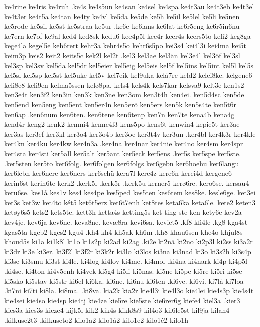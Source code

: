 {{ke4rine
ke4ris
ke4ruh
.ke4s
ke4s5un
ke4san
ke4sel
ke4spa
ke4t3au
ke4t3eb
ke4t3el
ke4t3er
ke4t5a
ke4tan
ke4ty
ke4vl
ke5da
ke5de
ke5h
ke5il
ke5lel
ke5li
ke5nen
ke5rode
ke5sil
ke5st
ke5straa
ke5ur
.ke6e
ke6lans
ke6lat
ke6r5eng
ke6r5in6nu
ke7ern
ke7of
ke9al
ked4
ked8sk
kedu6
kee4p5l
kee4r
keer4s
keers5to
kefi2
keg8ga
kege4la
kegel5e
keh6rert
kehr3a
kehr4s5o
kehr6s5po
kei3s4
kei4l3i
kei4ma
kei5t
keim3p
keis2
keit2
keits5c
kek2l
kel2t
.kel3
kel3ae
kel3än
kel3e4l
kel3öf
kel3sl
kel3sp
kel3sv
kel5da
kel5dr
kel5eier
kel5eig
kel5eis
kel5f
kel5ins
kel5int
kel5l
kel5s
kel5sl
kel5sp
kel5st
kel5uke
kel5v
kel7eik
kel9uka
kelå7re
keld2
kelei8ke.
kelgene6
keli8e8
keli9en
kelma5ssen
kelø8pa.
kels4
kels4k
kels7kar
kelsva9
kelt3e
ken1s2
ken3e4t
ken3f2
ken3in
ken3k
ken3ne
ken3om
ken3t4h
ken4ei.
ken5d4sc
ken5de
ken5end
ken5eng
ken5ent
ken5er4n
ken5erö
ken5ers
ken5k
ken5s4te
ken5t6r
ken6ap
.ken6num
ken6ten.
ken6tene
ken6tenp
ken7n
ken7te
kena4b
kena4g
kend4r
keng2
kenk2
kenmi4
kenne4l3
kens5po
kens6t
kenwin4
kepie5t
ker3ae
ker3as
ker3ef
ker3kl
ker3o4
ker3o4b
ker3oe
ker3t4v
ker3un
.ker4bl
ker4k3r
ker4kle
ker4kn
ker4ku
ker4kw
ker4n3a
.ker4na
ker4nar
ker4nie
ker4no
ker4sm
ker4spr
ker4sta
ker4sti
ker5all
ker5alt
ker5ant
ker5eck
ker5ens
.ker5s
ker5spe
ker5ste.
.ker5sten
ker5to
ker6folg.
ker6folgen
ker6folgs
ker6gebn
ker6hoehu
ker6langu
ker6lebn
ker6nere
ker6ners
ker6schü
kera7l
kere4z
kere6n
kerei4d
kergene6
kerin6st
kerin6te
kerk2
.kerk5l
.kerk5r
.kerk5u
kerner5
kerø6re.
kero6se.
kersau4
keru6se.
kes1å
kes1v
kes4
kes4pe
kes5ped
kes5ten
kes6tem
kes8ke.
kesle6ge.
ket3ei
ket3s
ket3w
ket4to
két5
ket6t5erz
ket6t7enh
ket8tes
keta6ka
keta6le.
kete2
keten3
ketøy6s5
kets2
kets5te.
kett3h
ketta4s
ketting5s
ket-ting-ste-ken
kety6e
kev2a
kev4je.
kev6ja
kev6ne.
keva8ne.
kevæ8ra
kevi6sa.
keviet5
.kf8
kfi4le
.kg8
kga4st
kgas5ta
kgeb2
kges2
kgu4
.kh4
kh4
kh5ak
kh6m
.kh8
khau6sen
khe4o
khjul8s
khoud5s
ki1a
ki1k8l
ki1o
ki1s2p
ki2ad
ki2ag
.ki2e
ki2nä
ki2no
ki2p3l
ki2ss
ki3a2r
ki3dr
ki3e
ki3er.
ki3f2l
ki3f2r
ki3k2r
ki3lo
ki3los
ki3na
ki3nad
ki3o
ki3s2h
ki3s4p
ki3se
ki3smu
ki3st
ki4le.
ki4log
ki4lov
ki4me.
ki4mol
.ki4na
ki4nark
ki4p
ki4p5l
.ki4se.
ki4ton
ki4v5enh
ki4vek
ki5g4
ki5li
ki5nas.
ki5ne
ki5pe
ki5re
ki5ri
ki5se
ki5sko
ki5stav
ki5str
ki6el
ki6ka.
ki6ne.
ki6nu
ki6ten
.ki6ve.
ki6vi.
ki7lå
ki7loa
.ki7ni
ki7ti
ki8la.
ki8ma.
.ki8va.
kia2k
kia2r
kie4l3i
kie4l3o
kie4lei
kie4s3p
kie4s4t
kie4sei
kie4so
kie4sp
kie4tj
kie4ze
kie5re
kie5ste
kie6rer6g
kiefe4
kiel3a
.kier3
kies3a
kies3s
kieze4
kijk5l
kik2
kik4s
kikk8s9
kil4o3
kil6le5st
kil9ja
kilan4
.kilkuse2t3
.kilkuseto2
kilo1a2
kilo1á2
kilo1e2
kilo1é2
kilo1h
}}
